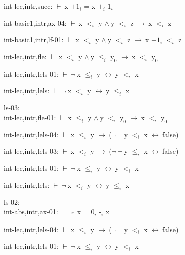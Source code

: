 \documentclass[a4paper]{article}
\newcommand{\tildesym}{\raisebox{-4pt}{\bf\~{}}}
\newcommand{\Fol}{\mbox{$\vdash\ $}}
\newcommand{\Not}{\mbox{$\neg\ $}}
\newcommand{\And}{\mbox{$\wedge\ $}}
\newcommand{\Imp}{\mbox{$\rightarrow\ $}}
\newcommand{\Equiv}{\mbox{$\leftrightarrow\ $}}
\begin{document}
int-lec,intr,succ: 
 \Fol x $\mbox{+1}_{i}$ = x $\mbox{+}_{i}$ $\mbox{1}_{i}$



int-basic1,intr,ax-04: 
 \Fol x $\mbox{$<$}_{i}$ y \And y $\mbox{$<$}_{i}$ z \Imp x $\mbox{$<$}_{i}$ z



int-basic1,intr,lf-01: 
 \Fol x $\mbox{$<$}_{i}$ y \And y $\mbox{$<$}_{i}$ z \Imp x $\mbox{+1}_{i}$ $\mbox{$<$}_{i}$ z



int-lec,intr,fle: 
 \Fol x $\mbox{$<$}_{i}$ y \And y $\mbox{$\le$}_{i}$ $\mbox{y}_{0}$ \Imp x $\mbox{$<$}_{i}$ $\mbox{y}_{0}$



int-lec,intr,lels-01: 
 \Fol \Not x $\mbox{$\le$}_{i}$ y \Equiv y $\mbox{$<$}_{i}$ x



int-lec,intr,lels: 
 \Fol \Not x $\mbox{$<$}_{i}$ y \Equiv y $\mbox{$\le$}_{i}$ x



\bigskip

ls-03:\\ int-lec,intr,fle-01: 
 \Fol x $\mbox{$\le$}_{i}$ y \And y $\mbox{$<$}_{i}$ $\mbox{y}_{0}$ \Imp x $\mbox{$<$}_{i}$ $\mbox{y}_{0}$



int-lec,intr,lels-04: 
 \Fol x $\mbox{$\le$}_{i}$ y \Imp (\Not \Not y $\mbox{$<$}_{i}$ x \Equiv false)



int-lec,intr,lels-03: 
 \Fol x $\mbox{$<$}_{i}$ y \Imp (\Not \Not y $\mbox{$\le$}_{i}$ x \Equiv false)



int-lec,intr,lels-01: 
 \Fol \Not x $\mbox{$\le$}_{i}$ y \Equiv y $\mbox{$<$}_{i}$ x



int-lec,intr,lels: 
 \Fol \Not x $\mbox{$<$}_{i}$ y \Equiv y $\mbox{$\le$}_{i}$ x



\bigskip

ls-02:\\ int-abs,intr,ax-01: 
 \Fol $\tildesym$ x = $\mbox{0}_{i}$ $\mbox{-}_{i}$ x

int-lec,intr,lels-04: 
 \Fol x $\mbox{$\le$}_{i}$ y \Imp (\Not \Not y $\mbox{$<$}_{i}$ x \Equiv false)



int-lec,intr,lels-01: 
 \Fol \Not x $\mbox{$\le$}_{i}$ y \Equiv y $\mbox{$<$}_{i}$ x
\end{document}
